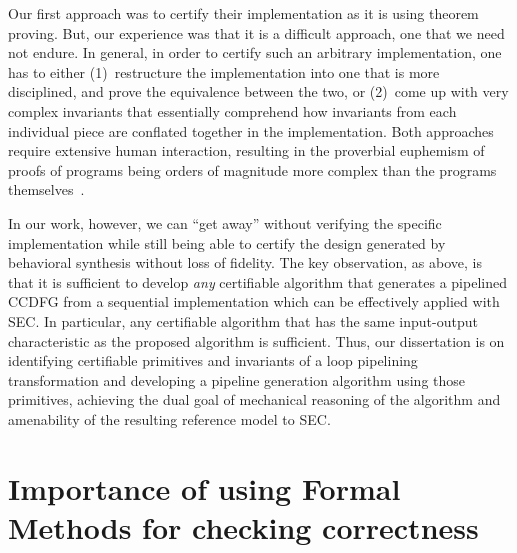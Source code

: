 Our first approach was to certify their implementation as it is using theorem proving. 
But, our experience was that it is a difficult approach, one that we need not endure.
In general, in order to certify such an arbitrary implementation,
one has to either (1)~restructure the implementation into
one that is more disciplined, and prove the equivalence
between the two, or (2)~come up with very complex
invariants that essentially comprehend how invariants from
each individual piece are conflated together in the
implementation.  Both approaches require extensive human
interaction, resulting in the proverbial euphemism of proofs
of programs being orders of magnitude more complex than the
programs themselves~\cite{liu}.


In our work, however, we can ``get away'' without verifying
the specific implementation while still being able to
certify the design generated by behavioral synthesis without
loss of fidelity. The key observation, as above, is that it
is sufficient to develop {\em any} certifiable algorithm
that generates a pipelined CCDFG from a sequential
implementation which can be effectively applied with SEC.
In particular, any certifiable algorithm that has the same
input-output characteristic as the proposed algorithm
is sufficient.  Thus, our dissertation is on identifying
certifiable primitives and invariants of a loop pipelining
transformation and developing a pipeline generation
algorithm using those primitives, achieving the dual goal of
mechanical reasoning of the algorithm and amenability of the
resulting reference model to SEC.

\section{Importance of using Formal Methods for checking correctness}

